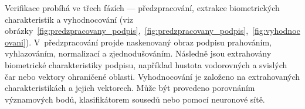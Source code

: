 Verifikace probíhá ve třech fázích --- předzpracování, extrakce biometrických charakteristik a vyhodnocování (viz obrázky~\ref{fig:predzpracovany_podpis},~\ref{fig:predzpracovany_podpis},~\ref{fig:vyhodnocovani}). %
V~předzpracování projde naskenovaný obraz podpisu prahováním, vyhlazováním, normalizací a zjednodušováním. %
Následně jsou extrahovány biometrické charakteristiky podpisu,                                             %
například hustota vodorovných a svislých čar nebo vektory ohraničené oblasti.                              %
Vyhodnocování je založeno na extrahovaných charakteristikách a jejich vektorech.                           %
Může být provedeno porovnáním významových bodů, klasifikátorem sousedů nebo  pomocí neuronové sítě.\cite{RakRoman2008}%

